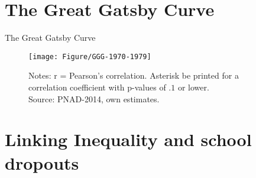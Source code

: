 \documentclass{beamer}
\begin{document}
\section{The Great Gatsby Curve}



\begin{frame} {The Great Gatsby Curve}
\begin{figure}[htb]
\centering
\texttt{[image: Figure/GGG-1970-1979]}
\begin{minipage}{0.82\textwidth} %
{\fontsize{5}{1}\selectfont
\vspace*{-4mm}  
Notes: r = Pearson's correlation. Asterisk be printed for a correlation coefficient with p-values of $.1$ or lower. \\ Source: PNAD-2014, own estimates.\par}
\end{minipage}
\end{figure}
\end{frame}










\section{Linking Inequality and school dropouts}
\end{document}
